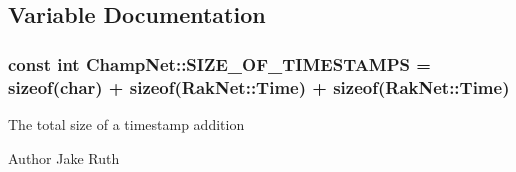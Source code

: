 \subsection{Variable Documentation}
\hypertarget{namespace_champ_net_ae8bece8e869e20f234d9ae67256a735f}{
\subsubsection[{S\-I\-Z\-E\-\_\-\-O\-F\-\_\-\-T\-I\-M\-E\-S\-T\-A\-M\-P\-S}]{\setlength{\rightskip}{0pt plus 5cm}const int Champ\-Net\-::\-S\-I\-Z\-E\-\_\-\-O\-F\-\_\-\-T\-I\-M\-E\-S\-T\-A\-M\-P\-S = sizeof(char) + sizeof(Rak\-Net\-::\-Time) + sizeof(Rak\-Net\-::\-Time)}}\label{namespace_champ_net_ae8bece8e869e20f234d9ae67256a735f}
The total size of a timestamp addition \begin{DoxyAuthor}{Author}
Jake Ruth 
\end{DoxyAuthor}
